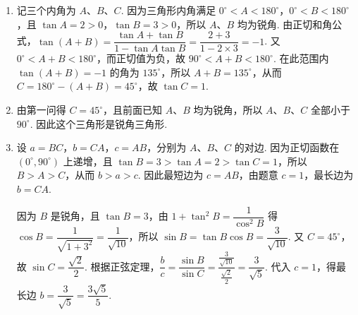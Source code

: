 \begin{solution}
\begin{enumerate}
    \item 记三个内角为 \(A\)、\(B\)、\(C\). 因为三角形内角满足 \(0^\circ<A<180^\circ\)，\(0^\circ<B<180^\circ\)，且 \(\tan A=2>0\)，\(\tan B=3>0\)，所以 \(A\)、\(B\) 均为锐角. 由正切和角公式，\(\tan(A+B)=\dfrac{\tan A+\tan B}{1-\tan A\tan B}=\dfrac{2+3}{1-2\times3}=-1\). 又 \(0^\circ<A+B<180^\circ\)，而正切值为负，故 \(90^\circ<A+B<180^\circ\). 在此范围内 \(\tan(A+B)=-1\) 的角为 \(135^\circ\)，所以 \(A+B=135^\circ\)，从而 \(C=180^\circ-(A+B)=45^\circ\)，故 \(\tan C=1\).
    \item 由第一问得 \(C=45^\circ\)，且前面已知 \(A\)、\(B\) 均为锐角，所以 \(A\)、\(B\)、\(C\) 全部小于 \(90^\circ\). 因此这个三角形是锐角三角形.
    \item 设 \(a=BC\)，\(b=CA\)，\(c=AB\)，分别为 \(A\)、\(B\)、\(C\) 的对边. 因为正切函数在 \((0^\circ,90^\circ)\) 上递增，且 \(\tan B=3>\tan A=2>\tan C=1\)，所以 \(B>A>C\)，从而 \(b>a>c\). 因此最短边为 \(c=AB\)，由题意 \(c=1\)，最长边为 \(b=CA\).

    因为 \(B\) 是锐角，且 \(\tan B=3\)，由 \(1+\tan^2B=\dfrac{1}{\cos^2B}\) 得 \(\cos B=\dfrac{1}{\sqrt{1+3^2}}=\dfrac{1}{\sqrt{10}}\)，所以 \(\sin B=\tan B\cos B=\dfrac{3}{\sqrt{10}}\). 又 \(C=45^\circ\)，故 \(\sin C=\dfrac{\sqrt{2}}{2}\). 根据正弦定理，\(\dfrac{b}{c}=\dfrac{\sin B}{\sin C}=\dfrac{\frac{3}{\sqrt{10}}}{\frac{\sqrt{2}}{2}}=\dfrac{3}{\sqrt{5}}\). 代入 \(c=1\)，得最长边 \(b=\dfrac{3}{\sqrt{5}}=\dfrac{3\sqrt{5}}{5}\).
\end{enumerate}
\end{solution}
